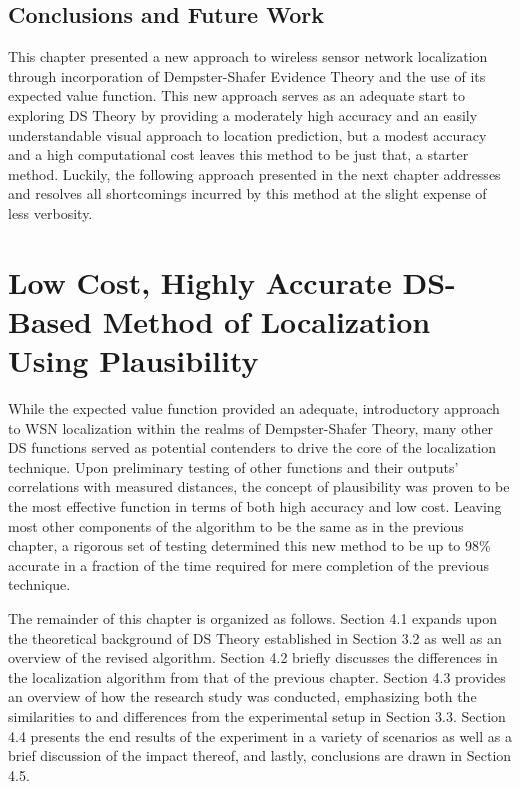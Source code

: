 \documentclass[12pt]{uthesis-v12}  %
\begin{document}
\section{Conclusions and Future Work}

This chapter presented a new approach to wireless sensor network localization through incorporation of Dempster-Shafer Evidence Theory and the use of its expected value function. This new approach serves as an adequate start to exploring DS Theory by providing a moderately high accuracy and an easily understandable visual approach to location prediction, but a modest accuracy and a high computational cost leaves this method to be just that, a starter method. Luckily, the following approach presented in the next chapter addresses and resolves all shortcomings incurred by this method at the slight expense of less verbosity.


\chapter{Low Cost, Highly Accurate DS-Based Method of Localization Using Plausibility}

While the expected value function provided an adequate, introductory approach to WSN localization within the realms of Dempster-Shafer Theory, many other DS functions served as potential contenders to drive the core of the localization technique. Upon preliminary testing of other functions and their outputs' correlations with measured distances, the concept of plausibility was proven to be the most effective function in terms of both high accuracy and low cost. Leaving most other components of the algorithm to be the same as in the previous chapter, a rigorous set of testing determined this new method to be up to 98\% accurate in a fraction of the time required for mere completion of the previous technique.

The remainder of this chapter is organized as follows. Section 4.1 expands upon the theoretical background of DS Theory established in Section 3.2 as well as an overview of the revised algorithm. Section 4.2 briefly discusses the differences in the localization algorithm from that of the previous chapter. Section 4.3 provides an overview of how the research study was conducted, emphasizing both the similarities to and differences from the experimental setup in Section 3.3. Section 4.4 presents the end results of the experiment in a variety of scenarios as well as a brief discussion of the impact thereof, and lastly, conclusions are drawn in Section 4.5.
\end{document}
